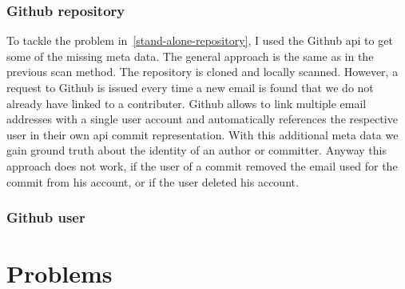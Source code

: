\subsubsection{Github repository}
To tackle the problem in~\ref{stand-alone-repository}, I used the Github \ac{api} to get some of the missing meta data.
The general approach is the same as in the previous scan method. The repository is cloned and locally scanned.
However, a request to Github is issued every time a new email is found that we do not already have linked to a contributer.
Github allows to link multiple email addresses with a single user account and automatically references the respective user in their own \ac{api} commit representation.
With this additional meta data we gain ground truth about the identity of an author or committer.
Anyway this approach does not work, if the user of a commit removed the email used for the commit from his account, or if the user deleted his account.


\subsubsection{Github user}




\section{Problems}

